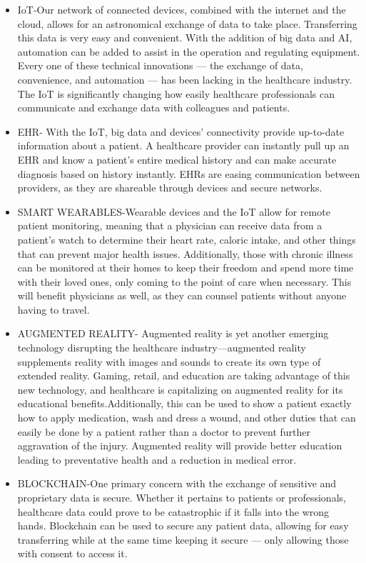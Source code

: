 \documentclass[12 pt]{article}
\begin{document}
\begin{itemize}
\item 
IoT-Our network of connected devices, combined with the internet and the cloud, allows for an astronomical exchange of data to take place. Transferring this data is very easy and convenient. With the addition of big data and AI, automation can be added to assist in the operation and regulating equipment. Every one of these technical innovations — the exchange of data, convenience, and automation — has been lacking in the healthcare industry. The IoT is significantly changing how easily healthcare professionals can communicate and exchange data with colleagues and patients.
\item
EHR- With the IoT, big data and devices’ connectivity provide up-to-date information about a patient. A healthcare provider can instantly pull up an EHR and know a patient’s entire medical history and can make accurate diagnosis based on history instantly.
EHRs are easing communication between providers, as they are shareable through devices and secure networks. 
\item
SMART WEARABLES-Wearable devices and the IoT allow for remote patient monitoring, meaning that a physician can receive data from a patient’s watch to determine their heart rate, caloric intake, and other things that can prevent major health issues. Additionally, those with chronic illness can be monitored at their homes to keep their freedom and spend more time with their loved ones, only coming to the point of care when necessary. This will benefit physicians as well, as they can counsel patients without anyone having to travel.
\item
AUGMENTED REALITY- Augmented reality is yet another emerging technology disrupting the healthcare industry—augmented reality supplements reality with images and sounds to create its own type of extended reality. Gaming, retail, and education are taking advantage of this new technology, and healthcare is capitalizing on augmented reality for its educational benefits.Additionally, this can be used to show a patient exactly how to apply medication, wash and dress a wound, and other duties that can easily be done by a patient rather than a doctor to prevent further aggravation of the injury. Augmented reality will provide better education leading to preventative health and a reduction in medical error.
\item
BLOCKCHAIN-One primary concern with the exchange of sensitive and proprietary data is secure. Whether it pertains to patients or professionals, healthcare data could prove to be catastrophic if it falls into the wrong hands. Blockchain can be used to secure any patient data, allowing for easy transferring while at the same time keeping it secure — only allowing those with consent to access it.

\end{itemize}
\end{document}

